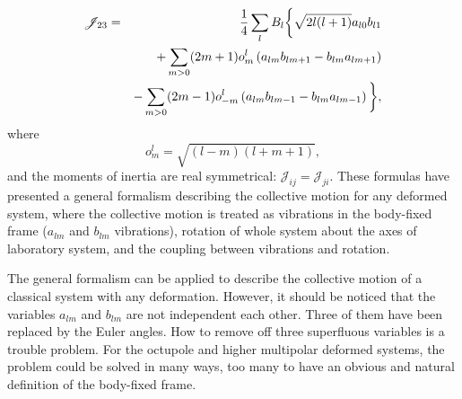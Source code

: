 \documentclass[twocolumn,prc,showpacs,preprintnumbers,superscriptaddress,floatfix]{revtex4}
\begin{document}
\begin{eqnarray}
\mathscr{J}_{23} &=&\frac{1}{4}\sum_{l}B_{l}\bigg\{\sqrt{2l(l+1)}a_{l0}b_{l1}
\notag \\
&&+\sum_{m>0}(2m+1)o_{m}^{l}\left( a_{lm}b_{lm+1}-b_{lm}a_{lm+1}\right)
\notag \\
&&-\sum_{m>0}(2m-1)o_{-m}^{l}\left( a_{lm}b_{lm-1}-b_{lm}a_{lm-1}\right) %
\bigg\},  \label{J23}
\end{eqnarray}%
where
\begin{equation}
o_{m}^{l}=\sqrt{\left( l-m\right) \left( l+m+1\right) },  \label{olm}
\end{equation}%
and the moments of inertia are real symmetrical: $\mathscr{J}_{ij}=%
\mathscr{J}_{ji}$. These formulas have presented a general formalism
describing the collective motion for any deformed system, where the
collective motion is treated as vibrations in the body-fixed frame ($a_{lm}$
and $b_{lm}$ vibrations), rotation of whole system about the axes of
laboratory system, and the coupling between vibrations and rotation.

The general formalism can be applied to describe the collective motion of a
classical system with any deformation. However, it should be noticed that
the variables $a_{lm}$ and $b_{lm}$ are not independent each other. Three of
them have been replaced by the Euler angles. How to remove off three
superfluous variables is a trouble problem. For the octupole and higher
multipolar deformed systems, the problem could be solved in many ways, too
many to have an obvious and natural definition of the body-fixed frame.
\end{document}
